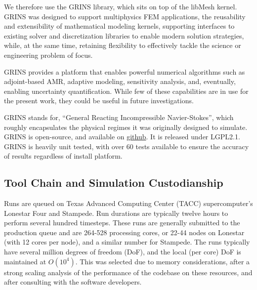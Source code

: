 We therefore use the GRINS library\cite{GRINSpaper}, which sits on
top of the libMesh kernel. GRINS was designed to support multiphysics FEM
applications, the reusability and extensibility of mathematical
modeling kernels, supporting interfaces to existing solver and
discretization libraries to enable modern solution strategies, while, at
the same time, retaining flexibility to effectively tackle the science
or engineering problem of focus. 

GRINS provides a platform that enables powerful numerical algorithms
such as adjoint-based AMR, adaptive modeling, sensitivity analysis,
and, eventually, enabling uncertainty quantification. While few of these
capabilities are in use for the present work, they could be useful in
future investigations. 

GRINS stands for, ``General Reacting Incompressible Navier-Stokes'',
which roughly encapsulates the physical regimes it was originally
designed to simulate. GRINS is open-source, and available on
\hyperref[www.github.com/grinsfem/grins]{github}. It is released 
under LGPL2.1.  GRINS is heavily unit tested, with over 60 tests
available to ensure the accuracy of results regardless of install platform.






\subsection{Tool Chain and Simulation Custodianship}

Runs are queued on Texas Advanced Computing Center (TACC)
supercomputer's Lonestar Four and Stampede. Run durations are typically  
twelve hours to perform several hundred timesteps. 
These runs are generally submitted to the production queue and are  
264-528 processing cores, 
or 22-44 nodes on Lonestar (with 12 cores per node), and a similar number
for Stampede. The runs typically have several million degrees of freedom (DoF), 
and the local (per core) DoF is maintained at $O(10^4)$. This was
selected due to memory considerations, after a strong scaling
analysis of the performance of the codebase on these resources, and
after consulting with the software developers.  

